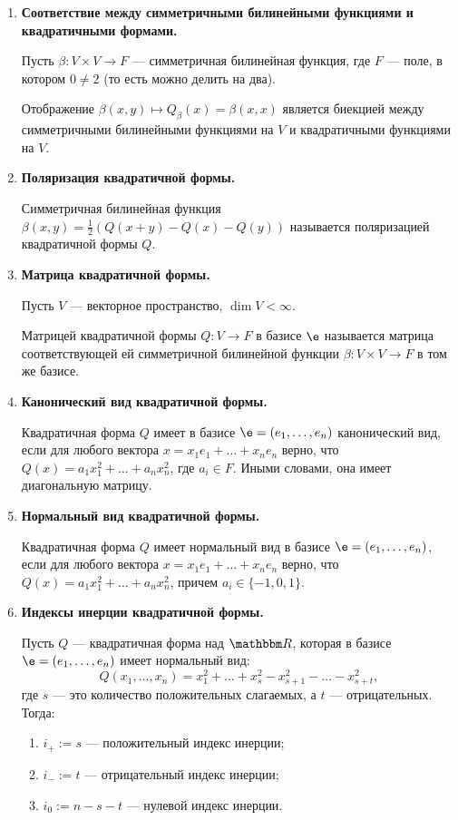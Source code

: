 \begin{enumerate}
\item \textbf{Соответствие между симметричными билинейными функциями и квадратичными формами.}

Пусть $\beta \colon V\times V \rightarrow F$ --- симметричная билинейная функция, где $F$ --- поле, в котором $0 \neq 2$ (то есть можно делить на два).

Отображение $\beta(x, y) \mapsto Q_\beta(x) = \beta(x, x)$ является биекцией между симметричными билинейными функциями на $V$ и квадратичными функциями на $V$.

\item \textbf{Поляризация квадратичной формы.}

Симметричная билинейная функция $\beta(x, y) = \frac{1}{2}\left( Q(x + y) - Q(x) - Q(y)  \right)$ называется поляризацией квадратичной формы $Q$.

\item \textbf{Матрица квадратичной формы.}

Пусть $V$ --- векторное пространство, $\dim V < \infty$.

Матрицей квадратичной формы $Q \colon V \to F$   в базисе $\e$ называется матрица  соответствующей ей симметричной билинейной функции $\beta \colon V \times V \rightarrow F$ в том же базисе. 

\item \textbf{Канонический вид квадратичной формы.}

Квадратичная форма $Q$ имеет в базисе $\e = (e_1, \ldots, e_n)$ канонический вид, если для любого вектора $x = x_1e_1 + \ldots + x_ne_n$ верно, что $Q(x) = a_1x_1^2 +\ldots + a_nx_n^2$, где $a_i \in F$. Иными словами, она имеет диагональную матрицу.

\item \textbf{Нормальный вид квадратичной формы.}

Квадратичная форма $Q$ имеет нормальный вид в базисе $\e = \vector{e}$, если для любого вектора $x = x_1e_1 + \ldots + x_ne_n$ верно, что $Q(x) = a_1x_1^2 +\ldots + a_nx_n^2$, причем $a_i \in \{-1, 0, 1\}$.  

\item \textbf{Индексы инерции квадратичной формы.}

Пусть $Q$ --- квадратичная форма над $\R$, которая в базисе $\e = \vector{e}$ имеет нормальный вид: 
$$
Q(x_1, \ldots, x_n) = x_1^2 + \ldots + x_s^2 - x_{s + 1}^2 - \ldots - x_{s + t}^2,
$$
где $s$ --- это количество положительных слагаемых, а $t$ --- отрицательных. Тогда:

\begin{enumerate}
\item $i_+ := s$ --- положительный индекс инерции;
\item $i_- := t$ --- отрицательный индекс инерции;
\item $i_0 := n - s - t$ --- нулевой индекс инерции.
\end{enumerate}


\end{enumerate}
